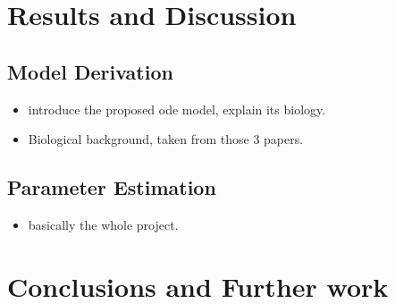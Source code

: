 \documentclass[10pt,journal]{./IEEE_latex_class/IEEEtran}
\begin{document}
\section{Results and Discussion}
\label{Results and Discussion}



\subsection{Model Derivation}

 \begin{itemize}
 \item introduce the proposed ode model, explain its biology.
 \item Biological background, taken from those 3 papers.
 \end{itemize}


\subsection{Parameter Estimation}
 \begin{itemize}
\item basically the whole project.
\cite{Isaacs2006}
 \end{itemize}
 
\section{Conclusions and Further work}
\label{Conclusions and Further work}




\end{document}
